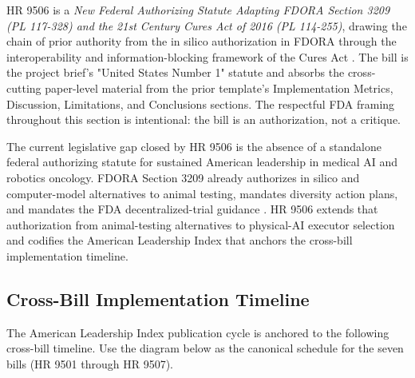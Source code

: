
\hspace{0.5cm} HR 9506 is a \textit{New Federal Authorizing Statute Adapting FDORA
Section 3209 (PL 117-328) and the 21st Century Cures Act of 2016
(PL 114-255)}, drawing the chain of prior authority from the in
silico authorization in FDORA through the interoperability and
information-blocking framework of the Cures Act
\cite{rank4_fdora_fda_modernization_2022, rank1_cures_act_2016}.
The bill is the project brief's "United States Number 1" statute and
absorbs the cross-cutting paper-level material from the prior
template's Implementation Metrics, Discussion, Limitations, and
Conclusions sections. The respectful FDA framing throughout this
section is intentional: the bill is an authorization, not a critique.

The current legislative gap closed by HR 9506 is the absence of a
standalone federal authorizing statute for sustained American
leadership in medical AI and robotics oncology. FDORA Section 3209
already authorizes in silico and computer-model alternatives to
animal testing, mandates diversity action plans, and mandates the
FDA decentralized-trial guidance \cite{rank4_fdora_fda_modernization_2022,
fda_dct_guidance_2024}. HR 9506 extends that authorization from
animal-testing alternatives to physical-AI executor selection and
codifies the American Leadership Index that anchors the cross-bill
implementation timeline.

\subsection{Cross-Bill Implementation Timeline}

\hspace{0.5cm} The American Leadership Index publication cycle is anchored to the
following cross-bill timeline. Use the diagram below as the canonical
schedule for the seven bills (HR 9501 through HR 9507).

